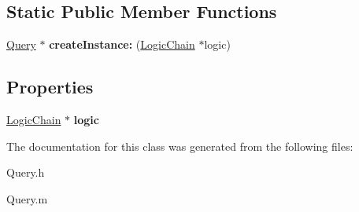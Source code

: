 \subsection*{\-Static \-Public \-Member \-Functions}
\begin{DoxyCompactItemize}
\item 
\hypertarget{interface_query_a8ea9b77831256192ac7c7a123ef3f9f8}{
\hyperlink{interface_query}{\-Query} $\ast$ {\bfseries create\-Instance\-:} (\hyperlink{interface_logic_chain}{\-Logic\-Chain} $\ast$logic)}
\label{interface_query_a8ea9b77831256192ac7c7a123ef3f9f8}

\end{DoxyCompactItemize}
\subsection*{\-Properties}
\begin{DoxyCompactItemize}
\item 
\hypertarget{interface_query_a1e3bd8d36bf4fada56b77376532f1f4f}{
\hyperlink{interface_logic_chain}{\-Logic\-Chain} $\ast$ {\bfseries logic}}
\label{interface_query_a1e3bd8d36bf4fada56b77376532f1f4f}

\end{DoxyCompactItemize}


\-The documentation for this class was generated from the following files\-:\begin{DoxyCompactItemize}
\item 
\-Query.\-h\item 
\-Query.\-m\end{DoxyCompactItemize}
